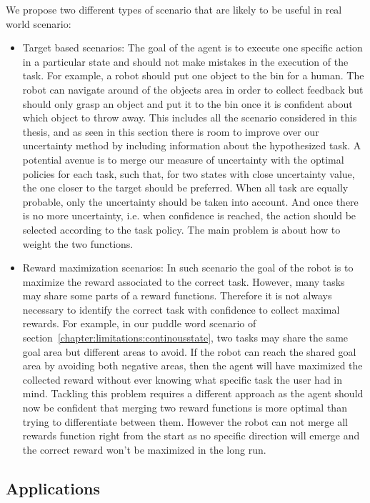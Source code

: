 We propose two different types of scenario that are likely to be useful in real world scenario: 
\begin{itemize}
\item Target based scenarios: The goal of the agent is to execute one specific action in a particular state and should not make mistakes in the execution of the task. For example, a robot should put one object to the bin for a human. The robot can navigate around of the objects area in order to collect feedback but should only grasp an object and put it to the bin once it is confident about which object to throw away. This includes all the scenario considered in this thesis, and as seen in this section there is room to improve over our uncertainty method by including information about the hypothesized task. A potential avenue is to merge our measure of uncertainty with the optimal policies for each task, such that, for two states with close uncertainty value, the one closer to the target should be preferred. When all task are equally probable, only the uncertainty should be taken into account. And once there is no more uncertainty, i.e. when confidence is reached, the action should be selected according to the task policy. The main problem is about how to weight the two functions.

\item Reward maximization scenarios: In such scenario the goal of the robot is to maximize the reward associated to the correct task. However, many tasks may share some parts of a reward functions. Therefore it is not always necessary to identify the correct task with confidence to collect maximal rewards. For example, in our puddle word scenario of section~\ref{chapter:limitations:continousstate}, two tasks may share the same goal area but different areas to avoid. If the robot can reach the shared goal area by avoiding both negative areas, then the agent will have maximized the collected reward without ever knowing what specific task the user had in mind. Tackling this problem requires a different approach as the agent should now be confident that merging two reward functions is more optimal than trying to differentiate between them. However the robot can not merge all rewards function right from the start as no specific direction will emerge and the correct reward won't be maximized in the long run.
\end{itemize}


\subsection{Applications}

